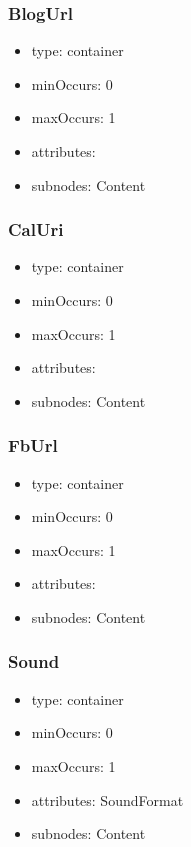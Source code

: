 \documentclass[a4paper,11pt]{article}
\begin{document}
\subsubsection{BlogUrl}
\begin{itemize}
  \item type: container
  \item minOccurs: 0
  \item maxOccurs: 1
  \item attributes:
  \item subnodes:
  \subitem Content
\end{itemize}

\subsubsection{CalUri}
\begin{itemize}
  \item type: container
  \item minOccurs: 0
  \item maxOccurs: 1
  \item attributes:
  \item subnodes:
  \subitem Content
\end{itemize}

\subsubsection{FbUrl}
\begin{itemize}
  \item type: container
  \item minOccurs: 0
  \item maxOccurs: 1
  \item attributes:
  \item subnodes:
  \subitem Content
\end{itemize}

\subsubsection{Sound}
\begin{itemize}
  \item type: container
  \item minOccurs: 0
  \item maxOccurs: 1
  \item attributes: SoundFormat
  \item subnodes:
  \subitem Content
\end{itemize}
\end{document}
